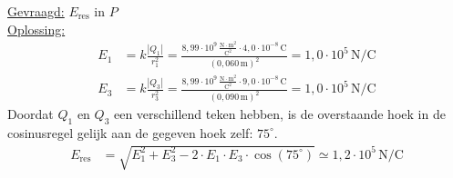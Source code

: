 \documentclass{ximera}
\begin{document}
\begin{exercise}
\begin{solution}
        \underline{Gevraagd:} $E_{\text{res}}$ in $P$\\

        \underline{Oplossing:}\\
        \begin{align*}
            E_{1} &= k \frac{|Q_{1}|}{r_{1}^{2}} = \frac{8{,}99 \cdot 10^{9} \, \mathrm{\frac{N \cdot m^2}{C^2}} \cdot 4{,}0 \cdot 10^{-8} \, \mathrm{C}}{(0{,}060 \, \mathrm{m})^{2}} = 1{,}0 \cdot 10^{5} \, \mathrm{N/C} \\
            E_{3} &= k \frac{|Q_{3}|}{r_{3}^{2}} = \frac{8{,}99 \cdot 10^{9} \, \mathrm{\frac{N \cdot m^2}{C^2}} \cdot 9{,}0 \cdot 10^{-8} \, \mathrm{C}}{(0{,}090 \, \mathrm{m})^{2}} = 1{,}0 \cdot 10^{5} \, \mathrm{N/C}
        \end{align*}
        Doordat $Q_1$ en $Q_3$ een verschillend teken hebben, is de overstaande hoek in de cosinusregel gelijk aan de gegeven hoek zelf: $75^\circ$.
        \begin{align*}
            E_{\text{res}} &= \sqrt{E_1^{2} + E_3^{2} - 2 \cdot E_1 \cdot E_3 \cdot \cos(75^\circ)} \simeq \boxed{1{,}2 \cdot 10^{5} \, \mathrm{N/C}}
        \end{align*}
    \end{solution}
\end{exercise}
\end{document}
